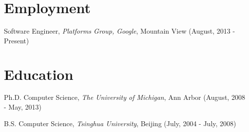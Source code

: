 \documentclass[letterpaper]{article}
\renewenvironment{itemize}{
  \begin{list}{}{
    \setlength{\leftmargin}{1em}
  }
}{
  \end{list}
}
\begin{document}
\section*{Employment}

\begin{itemize}
  \item Software Engineer, {\em Platforms Group, Google}, Mountain View (August, 2013 - Present)
\end{itemize}

\section*{Education}

\begin{itemize}
  \item Ph.D. Computer Science, {\em The University of Michigan}, Ann Arbor (August, 2008 - May, 2013)
  
  \item B.S. Computer Science, {\em Tsinghua University}, Beijing (July, 2004 - July, 2008)
 
\end{itemize}


%
\end{document}
